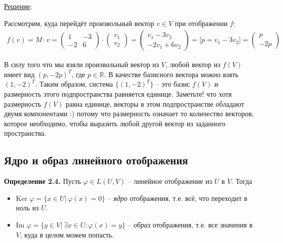 \documentclass[a4paper, 12pt]{article}
\begin{document}
\begin{spacing}{1.5}
\underline{Решение}:

\setlength{\leftskip}{5ex}
\setlength{\rightskip}{5ex}

Рассмотрим, куда перейдёт произвольный вектор $v \in V$ при отображении $f$:
\begin{align*}
f(v) = M \cdot v =
\begin{pmatrix}
1 & -3 \\
-2 & 6 
\end{pmatrix}
\cdot
\begin{pmatrix}
v_1 \\
v_2
\end{pmatrix}
=
\begin{pmatrix}
v_1 - 3 v_2 \\
-2 v_1 + 6 v_2
\end{pmatrix}
= \big[ p = v_1 - 3 v_2 \big] =
\begin{pmatrix}
p \\
-2 p
\end{pmatrix}
\end{align*}

В силу того что мы взяли произвольный вектор из $V$, любой вектор из $f(V)$ имеет вид $(p, -2p)^T$, где $p \in \mathbb{R}$. В качестве базисного вектора можно взять $(1, -2)^T$. Таким образом, система $\{ (1, -2)^T \}$ -- это базис $f(V)$ и размерность этого подпространства равняется единице.
Заметьте! что хотя размерность $f(V)$ равна единице, векторы в этом подпространстве обладают двумя компонентами :) потому что размерность означает то количество векторов, которое необходимо, чтобы выразить любой другой вектор из заданного пространства.

\setlength{\leftskip}{0ex}
\setlength{\rightskip}{0ex}


\subsection*{Ядро и образ линейного отображения}

\textbf{Определение 2.4.} 
Пусть $\varphi \in L(U,V)$ -- линейное отображение из $U$ в $V$. Тогда
\begin{itemize} [noitemsep]
    \item Ker $\varphi = \{ x \in U | \ \varphi(x) = 0\}$ -- \textit{ядро} отображения, т.е. всё, что переходит в ноль из $U$.
    \item Im $\varphi = \{y \in V | \ \exists x \in U : \varphi(x) = y \}$ -- \textit{образ} отображения, т.е. все значения в $V$, куда в целом можем попасть.
\end{itemize}


\end{spacing}
\end{document}

